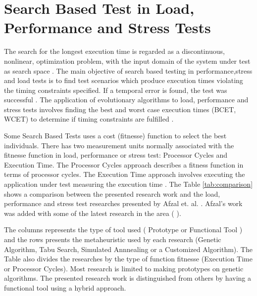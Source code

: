 \section{Search Based Test in Load, Performance and Stress Tests}

The search for the longest execution time is regarded as a discontinuous, nonlinear, optimization problem, with the input domain of the system under test as search space \cite{Sullivan}. The main objective of search based testing in performance,stress and load tests is to find test scenarios which produce execution times violating the timing constraints specified. If a temporal error is found, the test was successful \cite{Sullivan}. The application of evolutionary algorithms to load, performance and stress tests involves finding the best and worst case execution times (BCET, WCET) to determine if timing constraints are fulfilled \cite{Afzal2009a}. 

Some Search Based Tests uses a cost (fitnesse) function to select the best individuals. There has two measurement units normally associated with the fitnesse function in load, performance or stress test: Processor Cycles and Execution Time. The Processor Cycles approach describes a fitness function in terms of processor cycles. The Execution Time approach involves executing the application under test measuring the execution time \cite{Afzal2009} \cite{tracey2000search}.
%
%
The Table \ref{tab:comparison}  shows a comparison between the presented research work and the load, performance and stress test researches presented by Afzal et. al. \cite{Afzal2009}. Afzal's work was added with some of the latest research in the area (\cite{Garousi2006} \cite{Garousi2010} \cite{DiAlesio2013} \cite{DiAlesio2014} \cite{Alesio2015}). 


The columns represents the type of tool used ( Prototype or Functional Tool )  and the rows presents the metaheuristic used by each research (Genetic Algorithm, Tabu Search, Simulated Annnealing or a Customized Algorithm). The Table also divides the researches by the type of function fitnesse (Execution Time or Processor Cycles). Most research is limited to making prototypes on genetic algorithms. The presented research work is distinguished from others by having a functional tool using a hybrid approach. 



%
%

